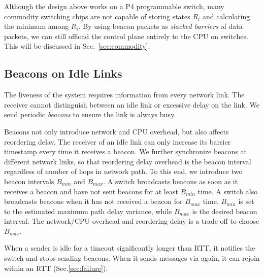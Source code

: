 Although the design above works on a P4 programmable switch, many commodity switching chips are not capable of storing states $R_i$ and calculating the minimum among $R_i$.
By using beacon packets as \textit{slacked barriers} of data packets, we can still offload the control plane entirely to the CPU on switches. This will be discussed in Sec.~\ref{sec:commodity}.

\subsection{Beacons on Idle Links}
\label{sec:beacon}

The liveness of the system requires information from every network link. The receiver cannot distinguish between an idle link or excessive delay on the link. We send periodic \textit{beacons} to ensure the link is always busy.


Beacons not only introduce network and CPU overhead, but also affects reordering delay. The receiver of an idle link can only increase its barrier timestamp every time it receives a beacon. We further synchronize beacons at different network links, so that reordering delay overhead is the beacon interval regardless of number of hops in network path. To this end, we introduce two beacon intervals $B_{min}$ and $B_{max}$. A switch broadcasts beacons as soon as it receives a beacon and have not sent beacons for at least $B_{min}$ time. A switch also broadcasts beacons when it has not received a beacon for $B_{max}$ time. $B_{min}$ is set to the estimated maximum path delay variance, while $B_{max}$ is the desired beacon interval. The network/CPU overhead and reordering delay is a trade-off to choose $B_{max}$.

When a sender is idle for a timeout significantly longer than RTT, it notifies the switch and stops sending beacons. When it sends messages via \sys again, it can rejoin within an RTT (Sec.\ref{sec:failure}).

